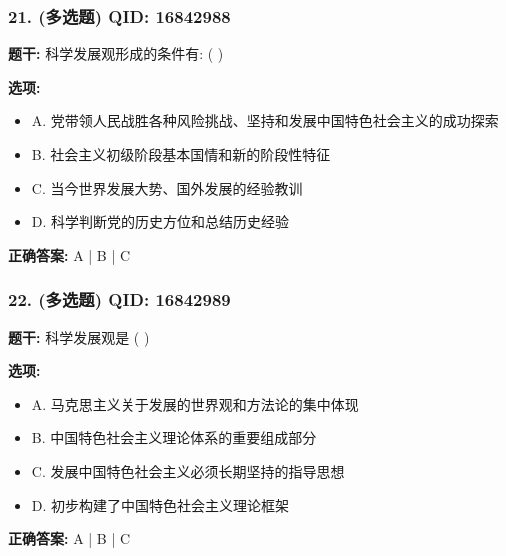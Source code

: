 \documentclass[12pt,UTF8]{ctexart}
\begin{document}
\subsubsection*{21. (多选题) \small QID: 16842988}

\textbf{题干:}
科学发展观形成的条件有: ( )

\textbf{选项:}
\begin{itemize}[leftmargin=*]

  \item A. 党带领人民战胜各种风险挑战、坚持和发展中国特色社会主义的成功探索

  \item B. 社会主义初级阶段基本国情和新的阶段性特征

  \item C. 当今世界发展大势、国外发展的经验教训

  \item D. 科学判断党的历史方位和总结历史经验

\end{itemize}

\textbf{正确答案:}
A | B | C

\vspace{0.3em}\hrulefill\vspace{0.7em}

\subsubsection*{22. (多选题) \small QID: 16842989}

\textbf{题干:}
科学发展观是 ( )

\textbf{选项:}
\begin{itemize}[leftmargin=*]

  \item A. 马克思主义关于发展的世界观和方法论的集中体现

  \item B. 中国特色社会主义理论体系的重要组成部分

  \item C. 发展中国特色社会主义必须长期坚持的指导思想

  \item D. 初步构建了中国特色社会主义理论框架

\end{itemize}

\textbf{正确答案:}
A | B | C

\vspace{0.3em}\hrulefill\vspace{0.7em}
\end{document}
